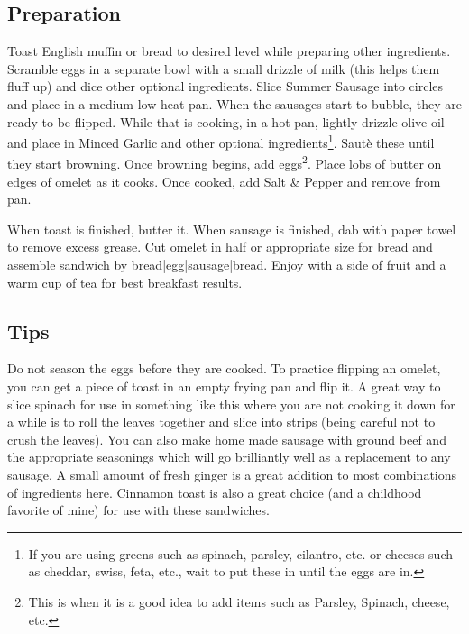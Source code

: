 \subsection*{Preparation}
Toast English muffin or bread to desired level while preparing other ingredients. Scramble eggs in a separate bowl with a small drizzle of milk (this helps them fluff up) and dice other optional ingredients. Slice Summer Sausage into circles and place in a medium-low heat pan. When the sausages start to bubble, they are ready to be flipped. While that is cooking, in a hot pan, lightly drizzle olive oil and place in Minced Garlic and other optional ingredients\footnote{If you are using greens such as spinach, parsley, cilantro, etc. or cheeses such as cheddar, swiss, feta, etc., wait to put these in until the eggs are in.}. Saut\`{e} these until they start browning. Once browning begins, add eggs\footnote{This is when it is a good idea to add items such as Parsley, Spinach, cheese, etc.}. Place lobs of butter on edges of omelet as it cooks. Once cooked, add Salt \& Pepper and remove from pan. 

\tab When toast is finished, butter it. When sausage is finished, dab with paper towel to remove excess grease. Cut omelet in half or appropriate size for bread and assemble sandwich by bread|egg|sausage|bread. Enjoy with a side of fruit and a warm cup of tea for best breakfast results.


\subsection*{Tips}

Do not season the eggs before they are cooked. To practice flipping an omelet, you can get a piece of toast in an empty frying pan and flip it. A great way to slice spinach for use in something like this where you are not cooking it down for a while is to roll the leaves together and slice into strips (being careful not to crush the leaves). You can also make home made sausage with ground beef and the appropriate seasonings which will go brilliantly well as a replacement to any sausage. A small amount of fresh ginger is a great addition to most combinations of ingredients here. Cinnamon toast is also a great choice (and a childhood favorite of mine) for use with these sandwiches.